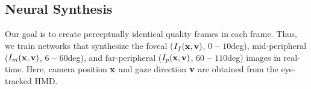 


\subsection{Neural Synthesis}
Our goal is to create perceptually identical quality frames in each frame. Thus, we train networks that synthesize the foveal ($I_{f}(\mathbf{x},\mathbf{v})$, $0-10$deg), mid-peripheral ($I_{m}(\mathbf{x},\mathbf{v})$, $6-60$deg), and far-peripheral ($I_{p}(\mathbf{x},\mathbf{v})$, $60-110$deg) images in real-time.
Here, camera position $\mathbf{x}$ and gaze direction $\mathbf{v}$ are obtained from the eye-tracked HMD.

